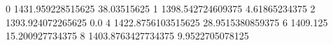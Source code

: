 0 1431.959228515625 38.03515625
1 1398.542724609375 4.61865234375
2 1393.924072265625 0.0
4 1422.8756103515625 28.9515380859375
6 1409.125 15.200927734375
8 1403.8763427734375 9.9522705078125
